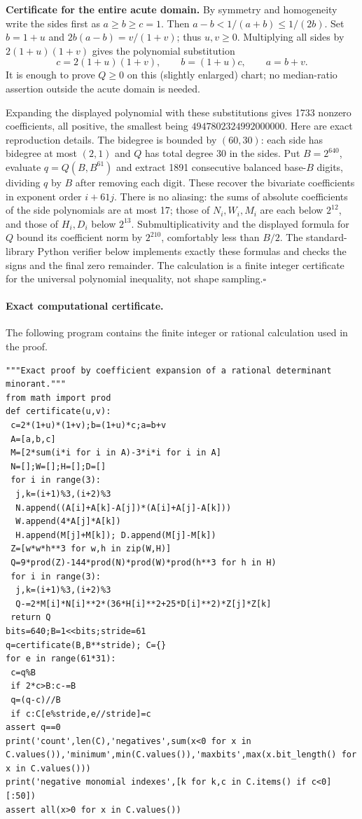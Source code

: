 \documentclass[11pt,a4paper]{article}
\numberwithin{equation}{section}
\theoremstyle{definition}
\theoremstyle{remark}
\begin{document}
\textbf{Certificate for the entire acute domain.} By symmetry and homogeneity write the sides first as $a\ge b\ge c=1$. Then $a-b<1/(a+b)\le1/(2b)$. Set $b=1+u$ and $2b(a-b)=v/(1+v)$; thus $u,v\ge0$. Multiplying all sides by $2(1+u)(1+v)$ gives the polynomial substitution
\[
 c=2(1+u)(1+v),\qquad b=(1+u)c,\qquad a=b+v.
\]
It is enough to prove $Q\ge0$ on this (slightly enlarged) chart; no median-ratio assertion outside the acute domain is needed.

Expanding the displayed polynomial with these substitutions gives 1733 nonzero coefficients, all positive, the smallest being $4947802324992000000$. Here are exact reproduction details. The bidegree is bounded by $(60,30)$: each side has bidegree at most $(2,1)$ and $Q$ has total degree 30 in the sides. Put $B=2^{640}$, evaluate $q=Q(B,B^{61})$ and extract 1891 consecutive balanced base-$B$ digits, dividing $q$ by $B$ after removing each digit. These recover the bivariate coefficients in exponent order $i+61j$. There is no aliasing: the sums of absolute coefficients of the side polynomials are at most 17; those of $N_i,W_i,M_i$ are each below $2^{12}$, and those of $H_i,D_i$ below $2^{13}$. Submultiplicativity and the displayed formula for $Q$ bound its coefficient norm by $2^{210}$, comfortably less than $B/2$. The standard-library Python verifier below implements exactly these formulas and checks the signs and the final zero remainder. The calculation is a finite integer certificate for the universal polynomial inequality, not shape sampling.\hfill$\square$

\paragraph{Exact computational certificate.}
The following program contains the finite integer or rational calculation used in the proof.
{\small
\begin{Verbatim}
"""Exact proof by coefficient expansion of a rational determinant minorant."""
from math import prod
def certificate(u,v):
 c=2*(1+u)*(1+v);b=(1+u)*c;a=b+v
 A=[a,b,c]
 M=[2*sum(i*i for i in A)-3*i*i for i in A]
 N=[];W=[];H=[];D=[]
 for i in range(3):
  j,k=(i+1)%3,(i+2)%3
  N.append((A[i]+A[k]-A[j])*(A[i]+A[j]-A[k]))
  W.append(4*A[j]*A[k])
  H.append(M[j]+M[k]); D.append(M[j]-M[k])
 Z=[w*w*h**3 for w,h in zip(W,H)]
 Q=9*prod(Z)-144*prod(N)*prod(W)*prod(h**3 for h in H)
 for i in range(3):
  j,k=(i+1)%3,(i+2)%3
  Q-=2*M[i]*N[i]**2*(36*H[i]**2+25*D[i]**2)*Z[j]*Z[k]
 return Q
bits=640;B=1<<bits;stride=61
q=certificate(B,B**stride); C={}
for e in range(61*31):
 c=q%B
 if 2*c>B:c-=B
 q=(q-c)//B
 if c:C[e%stride,e//stride]=c
assert q==0
print('count',len(C),'negatives',sum(x<0 for x in C.values()),'minimum',min(C.values()),'maxbits',max(x.bit_length() for x in C.values()))
print('negative monomial indexes',[k for k,c in C.items() if c<0][:50])
assert all(x>0 for x in C.values())
\end{Verbatim}

}
\end{document}
